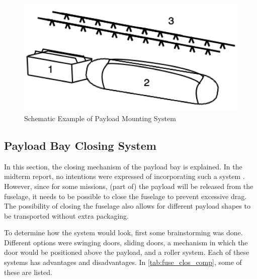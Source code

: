 \begin{figure}
    \centering
    \includegraphics[width = .5\textwidth]{CommandDataHandling/Figures/Payload_module}
    \caption{Schematic Example of Payload Mounting System}
    \label{fig:payl_moun_syst}
\end{figure}







\subsection{Payload Bay Closing System}
\label{sec:payl_bay_clos_syst}
In this section, the closing mechanism of the payload bay is explained. In the midterm report, no intentions were expressed of incorporating such a system \cite{midterm}. However, since for some missions, (part of) the payload will be released from the fuselage, it needs to be possible to close the fuselage to prevent excessive drag. The possibility of closing the fuselage also allows for different payload shapes to be transported without extra packaging.


To determine how the system would look, first some brainstorming was done. Different options were swinging doors, sliding doors, a mechanism in which the door would be positioned above the payload, and a roller system. Each of these systems has advantages and disadvantages. In \autoref{tab:fuse_clos_comp}, some of these are listed. 

